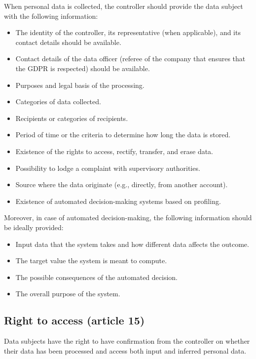 When personal data is collected, the controller should provide the data subject with the following information:
\begin{itemize}
    \item The identity of the controller, its representative (when applicable), and its contact details should be available.
    \item Contact details of the data officer (referee of the company that ensures that the GDPR is respected) should be available.
    \item Purposes and legal basis of the processing.
    \item Categories of data collected.
    \item Recipients or categories of recipients.
    \item Period of time or the criteria to determine how long the data is stored.
    \item Existence of the rights to access, rectify, transfer, and erase data.
    \item Possibility to lodge a complaint with supervisory authorities.
    \item Source where the data originate (e.g., directly, from another account).
    \item Existence of automated decision-making systems based on profiling.
\end{itemize}

Moreover, in case of automated decision-making, the following information should be ideally provided:
\begin{itemize}
    \item Input data that the system takes and how different data affects the outcome.
    \item The target value the system is meant to compute.
    \item The possible consequences of the automated decision.
    \item The overall purpose of the system.
\end{itemize} 


\subsection{Right to access (article 15)} 

Data subjects have the right to have confirmation from the controller on whether their data has been processed and access both input and inferred personal data.

